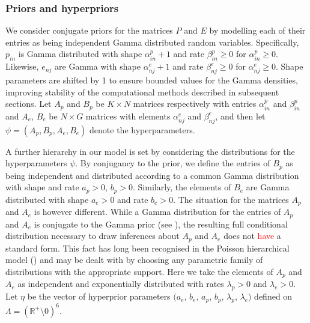 \documentclass{bioinfo}
\begin{document}
\subsubsection{Priors and hyperpriors}
We consider conjugate priors for the matrices $P$ and $E$ by modelling
each of their entries as being independent Gamma distributed random
variables. Specifically, $p_{in}$ is Gamma distributed with shape
$\alpha_{in}^p + 1$ and rate $\beta_{in}^p \geq 0$ for $\alpha_{in}^p
\geq 0$. Likewise, $e_{nj}$ are Gamma with shape $\alpha_{nj}^e+1$ and
rate $\beta_{nj}^e \geq 0$ for $\alpha_{nj}^e \geq 0$. Shape
parameters are shifted by 1 to ensure bounded values for the Gamma
densities, improving stability of the computational methods described
in subsequent sections. Let $A_p$ and $B_p$ be $K\times N$ matrices
respectively with entries $\alpha_{in}^p$ and $\beta_{in}^p$ and
$A_e$, $B_e$ be $N\times G$ matrices with elements $\alpha_{nj}^e$ and
$\beta_{nj}^e$, and then let $\psi = (A_p, B_p, A_e, B_e)$ denote the
hyperparameters.


A further hierarchy in our model is set by considering the
distributions for the hyperparameters $\psi$. By conjugancy to the
prior, we define the entries of $B_p$ as being independent and
distributed according to a common Gamma distribution with shape and
rate $a_p > 0$, $b_p > 0$. Similarly, the elements of $B_e$ are Gamma
distributed with shape $a_e>0$ and rate $b_e>0$. The situation for the
matrices $A_p$ and $A_e$ is however different. While a Gamma
distribution for the entries of $A_p$ and $A_e$ is conjugate to the
Gamma prior (see \citealp{M}), the resulting full conditional
distribution necessary to draw inferences about $A_p$ and
$A_e$ does not \textcolor{red}{have} a standard form. This fact has
long been recognised in the Poisson hierarchical model
(\citealp{GMS93}) and may be dealt with by choosing any parametric
family of distributions with the appropriate support. Here we take the
elements of $A_p$ and $A_e$ as independent and exponentially
distributed with rates $\lambda_p > 0$ and $\lambda_e > 0$.  Let
$\eta$ be the vector of hyperprior parameters $(a_e$, $b_e$, $a_p$,
$b_p$, $\lambda_p$, $\lambda_e)$ defined on $\Lambda = (\mathbb
R^+\!\setminus 0)^6$.
\end{document}
